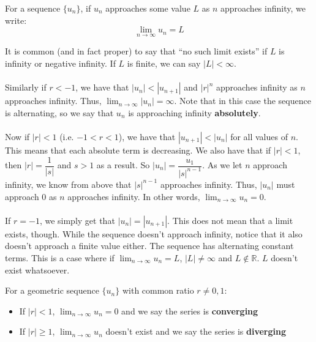 \documentclass[12pt, a4paper, titlepage, twoside]{article}
\newcommand*{\R}{\mathbb{R}}
\begin{document}
	\begin{kp}
		For a sequence $\{u_n\}$, if $u_n$ approaches some value $L$ as $n$ approaches infinity, we write:
		$$\lim_{n \to \infty} u_n = L$$
		
		It is common (and in fact proper) to say that ``no such limit exists'' if $L$ is infinity or negative infinity. If $L$ is finite, 
		we can say $|L| < \infty$.
	\end{kp}
	
	\paragraph{}
	Similarly if $r < -1$, we have that $|u_n| < |u_{n+1}|$ and $|r|^n$ approaches infinity as $n$ approaches infinity. Thus, 
	$\displaystyle \lim_{n \to \infty} |u_n| = \infty$. Note that in this case the sequence is alternating, so we say that $u_n$ is 
	approaching infinity \textbf{absolutely}. 
	
	\paragraph{}
	Now if $|r| < 1$ (i.e. $-1 < r < 1$), we have that $|u_{n+1}| < |u_n|$ for all values of $n$. This means that each absolute term is 
	decreasing. We also have that if $|r| < 1$, then $|r| = \dfrac{1}{|s|}$ and $s>1$ as a result. So $|u_n| = \dfrac{u_1}{|s|^{n-1}}$.
	As we let $n$ approach infinity, we know from above that $|s|^{n-1}$ approaches infinity. Thus, $|u_n|$ must approach 0 as $n$ 
	approaches infinity. In other words, $\displaystyle \lim_{n \to \infty} u_n = 0$.
	
	\paragraph{}
	If $r = -1$, we simply get that $|u_n| = |u_{n+1}|$. This does not mean that a limit exists, though. While the sequence doesn't
	approach infinity, notice that it also doesn't approach a finite value either. The sequence has alternating constant terms.
	This is a case where if $\displaystyle \lim_{n \to \infty} u_n = L$, $|L| \neq \infty$ and $L \not\in \R$. $L$ doesn't exist whatsoever.\\
	
	\begin{kp}
		For a geometric sequence $\{u_n\}$ with common ratio $r \neq 0,1$:
		\begin{itemize}
			\item If $|r| < 1$, $\displaystyle \lim_{n \to \infty} u_n = 0$ and we say the series is \textbf{converging}
			\item If $|r| \geqslant 1$, $\displaystyle \lim_{n \to \infty} u_n$ doesn't exist and we say the series is \textbf{diverging}
		\end{itemize}
	\end{kp}
	
\end{document}
